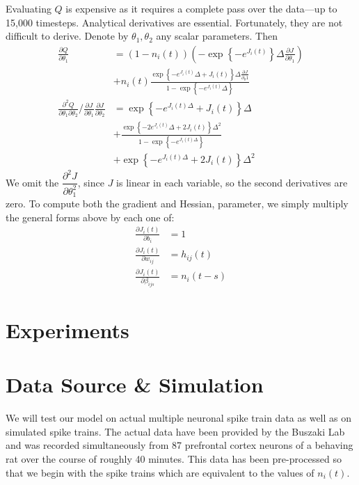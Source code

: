 \documentclass{article}
\begin{document}
Evaluating $Q$ is expensive as it requires a complete pass over the
data---up to 15,000 timesteps. Analytical derivatives are essential.
Fortunately, they are not difficult to derive. Denote by
$\theta_1, \theta_2$ any scalar parameters. Then
\begin{align*}
\frac{\partial Q}{\partial \theta_1} &= \left(1 - n_i(t)\right) \left(-\exp{\left\{-e^{J_i(t)}\right\}} \Delta \frac{\partial J}{\partial \theta_1}\right) \\
    &+ n_i(t) \frac{\exp{ \left\{ -e^{J_i(t)} \Delta + J_i(t) \right\}} \Delta \frac{\partial J}{\partial_\theta1} }{1 - \exp{\left\{-e^{J_i(t)}\Delta\right\}}} \\
\frac{\partial^2 Q}{\partial \theta_1 \partial \theta_2} / \frac{\partial J}{\partial \theta_1} \frac{\partial J}{\partial \theta_2} &= \exp{\left\{-e^{J_i(t)\Delta} + J_i(t)\right\}}\Delta \\
 &+ \frac{\exp{\left\{-2e^{J_i(t)}\Delta + 2J_i(t)\right\}}\Delta^2}{1 - \exp{\left\{-e^{J_i(t)\Delta}\right\}}} \\
 &+ \exp{\left\{-e^{J_i(t)\Delta} + 2J_i(t)\right\}} \Delta^2 
\end{align*}
We omit the $\dfrac{\partial^2 J}{\partial \theta_1^2}$, since $J$
is linear in each variable, so the second derivatives are zero. To
compute both the gradient and Hessian, parameter, we simply multiply
the general forms above by each one of:
\begin{align}
\frac{\partial J_i(t)}{\partial b_i}         &= 1 \\
\frac{\partial J_i(t)}{\partial w_{ij}}      &= h_{ij}(t) \\
\frac{\partial J_i(t)}{\partial \beta_{ijs}} &= n_i(t - s)
\end{align}

\section{Experiments}
\section{Data Source \& Simulation}

We will test our model on actual multiple neuronal spike train data as well as on simulated spike trains. The actual data have been provided by the Buszaki Lab and was recorded simultaneously from 87 prefrontal cortex neurons of a behaving rat over the course of roughly 40 minutes. This data has been pre-processed so that we begin with the spike trains which are equivalent to the values of $n_i(t)$.
\end{document}
